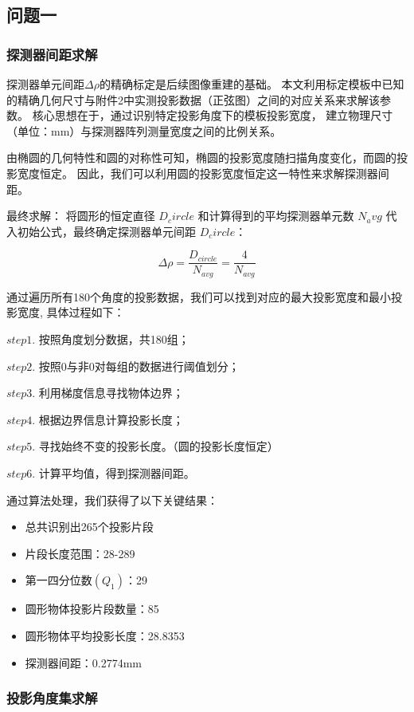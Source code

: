 \subsection{问题一}
\subsubsection{探测器间距求解}

探测器单元间距$\Delta\rho$的精确标定是后续图像重建的基础。
本文利用标定模板中已知的精确几何尺寸与附件2中实测投影数据（正弦图）之间的对应关系来求解该参数。
核心思想在于，通过识别特定投影角度下的模板投影宽度，
建立物理尺寸（单位：mm）与探测器阵列测量宽度之间的比例关系。\par


由椭圆的几何特性和圆的对称性可知，椭圆的投影宽度随扫描角度变化，而圆的投影宽度恒定。
因此，我们可以利用圆的投影宽度恒定这一特性来求解探测器间距。\par


最终求解：
将圆形的恒定直径 $D_circle$ 和计算得到的平均探测器单元数 $N_avg$ 代入初始公式，最终确定探测器单元间距 $D_circle$：

$$\Delta\rho = \frac{D_{circle}}{N_{avg}} = \frac{4}{N_{avg}}$$

通过遍历所有180个角度的投影数据，我们可以找到对应的最大投影宽度和最小投影宽度,
具体过程如下：\par
$step1.$ 按照角度划分数据，共180组；\par
$step2.$ 按照0与非0对每组的数据进行阈值划分；\par
$step3.$ 利用梯度信息寻找物体边界；\par
$step4.$ 根据边界信息计算投影长度；\par
$step5.$ 寻找始终不变的投影长度。（圆的投影长度恒定）\par
$step6.$ 计算平均值，得到探测器间距。

通过算法处理，我们获得了以下关键结果：
\begin{itemize}
    \item 总共识别出265个投影片段
    \item 片段长度范围：28-289
    \item 第一四分位数$(Q_1)$：29
    \item 圆形物体投影片段数量：85
    \item 圆形物体平均投影长度：28.8353
    \item 探测器间距：0.2774mm
\end{itemize}


\subsubsection{投影角度集求解}

